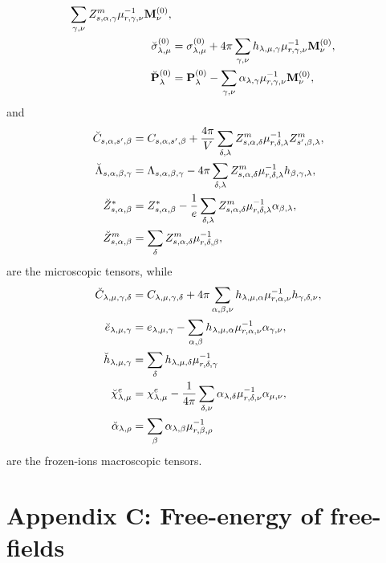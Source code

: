 \documentclass[12pt,a4paper]{article}
\begin{document}
{\begin{align}
\sum_{\gamma,\nu}
Z^m_{s,\alpha,\gamma} \mu^{-1}_{r,\gamma,\nu} {\bf M}^{(0)}_\nu, \\
\breve \sigma^{(0)}_{\lambda,\mu}&= \sigma^{(0)}_{\lambda,\mu}
+ 4 \pi \sum_{\gamma,\nu} h_{\lambda,\mu,\gamma} \mu^{-1}_{r,\gamma,\nu} 
{\bf M}^{(0)}_\nu, \\
\breve {\bf P}^{(0)}_\lambda&= {\bf P}^{(0)}_\lambda -
\sum_{\gamma,\nu} \alpha_{\lambda,\gamma} \mu^{-1}_{r,\gamma,\nu} 
{\bf M}^{(0)}_\nu, \\
\end{align}
and
\begin{align}
\breve C_{s,\alpha,s',\beta} &= C_{s,\alpha,s',\beta}+
{4 \pi \over V}  \sum_{\delta,\lambda} Z^m_{s,\alpha,\delta}
\mu^{-1}_{r,\delta,\lambda}Z^m_{s',\beta,\lambda},\\
\breve \Lambda_{s,\alpha,\beta,\gamma} &= \Lambda_{s,\alpha,\beta,\gamma}
- 4 \pi \sum_{\delta,\lambda} Z^m_{s,\alpha,\delta}
\mu^{-1}_{r,\delta,\lambda} h_{\beta,\gamma,\lambda}, \\
\breve Z^*_{s,\alpha,\beta} &= Z^*_{s,\alpha,\beta}
-{1\over e} \sum_{\delta,\lambda} Z^m_{s,\alpha,\delta} 
\mu^{-1}_{r,\delta,\lambda} \alpha_{\beta,\lambda}, \\
\breve Z^m_{s,\alpha,\beta} &= \sum_{\delta} Z^m_{s,\alpha,\delta} 
\mu^{-1}_{r,\delta,\beta}, 
\end{align}
are the microscopic tensors, while
\begin{align}
\breve C_{\lambda,\mu,\gamma,\delta} &=
C_{\lambda,\mu,\gamma,\delta} + 4 \pi \sum_{\alpha,\beta,\nu}
h_{\lambda,\mu,\alpha} \mu^{-1}_{r,\alpha,\nu} 
h_{\gamma,\delta,\nu}, \\
\breve e_{\lambda,\mu,\gamma}&= e_{\lambda,\mu,\gamma}
-\sum_{\alpha,\beta} h_{\lambda,\mu,\alpha} \mu^{-1}_{r,\alpha,\nu}
\alpha_{\gamma,\nu}, \\
\breve h_{\lambda,\mu,\gamma}&= \sum_\delta h_{\lambda,\mu,\delta}
\mu^{-1}_{r,\delta,\gamma} \\
\breve \chi^e_{\lambda,\mu}&= \chi^e_{\lambda,\mu}
-{1\over 4 \pi} \sum_{\delta,\nu} \alpha_{\lambda,\delta} 
\mu^{-1}_{r,\delta,\nu} \alpha_{\mu,\nu}, \\
\breve \alpha_{\lambda,\rho} &= \sum_\beta \alpha_{\lambda,\beta}
\mu^{-1}_{r,\beta,\rho}
\end{align}
are the frozen-ions macroscopic tensors.
}

\newpage
\section{\color{coral} Appendix C: Free-energy of free-fields }
\end{document}
